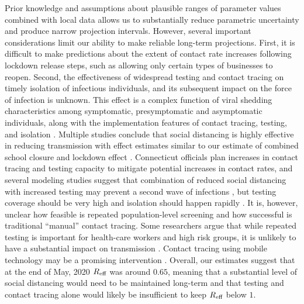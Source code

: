 \documentclass[11pt]{article}
\begin{document}
Prior knowledge and assumptions about plausible ranges of parameter values combined with local data allows us to substantially reduce parametric uncertainty and produce narrow projection intervals. However, several important considerations limit our ability to make reliable long-term projections. 
First, it is difficult to make predictions about the extent of contact rate increases following lockdown release steps, such as allowing only certain types of businesses to reopen.  Second, the effectiveness of widespread testing and contact tracing on timely isolation of infectious individuals, and its subsequent impact on the force of infection is unknown. This effect is a complex function of viral shedding characteristics among symptomatic, presymptomatic and asymptomatic individuals, along with the implementation features of contact tracing, testing, and isolation \citep{kaplan2020logistics}. 
Multiple studies conclude that social distancing is highly effective in reducing transmission with effect estimates similar to our estimate of combined school closure and lockdown effect \citep{salje2020estimating, perez2020importance, dehning2020inferring, brett2020covid,  prem2020effect}. 
Connecticut officials plan increases in contact tracing and testing capacity to mitigate potential increases in contact rates, and several modeling studies suggest that combination of reduced social distancing with increased testing may prevent a second wave of infections \citep{aleta2020modeling, childs2020impact}, but testing coverage should be very high and isolation should happen rapidly \citep{perez2020importance}. It is, however, unclear how feasible is repeated population-level screening and how successful is traditional ``manual'' contact tracing. Some researchers argue that while repeated testing is important for health-care workers and high risk groups, it is unlikely to have a substantial impact on transmission \citep{grassly2020role}. 
Contact tracing using mobile technology may be a promising intervention \citep{ferretti2020quantifying}. Overall, our estimates suggest that at the end of May, 2020 $R\textsubscript{eff}$ was around $0.65$, meaning that a substantial level of social distancing would need to be maintained long-term and that testing and contact tracing alone would likely be insufficient to keep $R\textsubscript{eff}$ below $1$.
\end{document}

